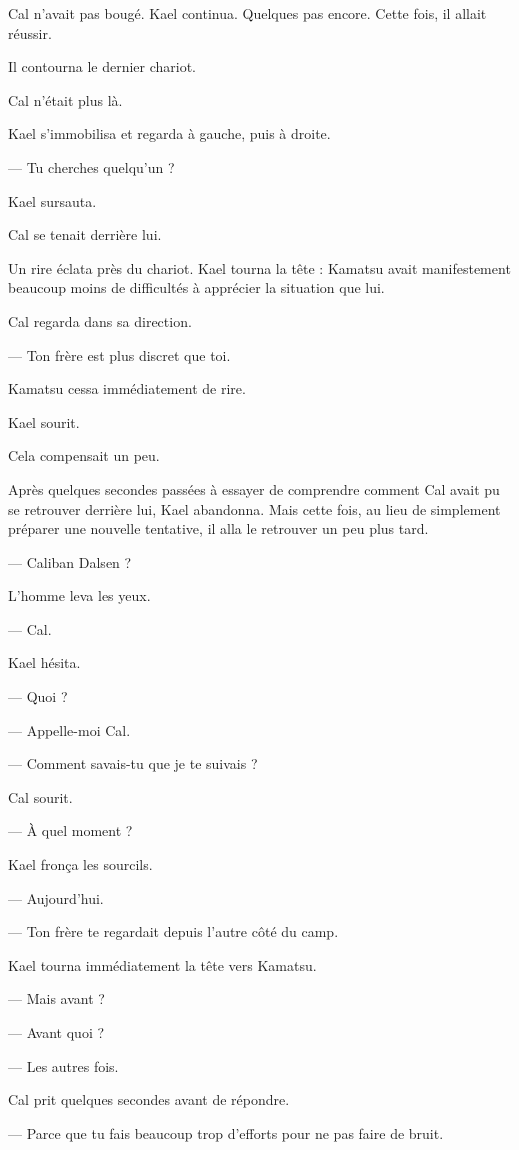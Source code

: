 Cal n'avait pas bougé. Kael continua. Quelques pas encore. Cette fois, il allait réussir.

Il contourna le dernier chariot.

Cal n'était plus là.

Kael s'immobilisa et regarda à gauche, puis à droite.

— Tu cherches quelqu'un ?

Kael sursauta.

Cal se tenait derrière lui.

Un rire éclata près du chariot. Kael tourna la tête : Kamatsu avait
manifestement beaucoup moins de difficultés à apprécier la situation que lui.

Cal regarda dans sa direction.

— Ton frère est plus discret que toi.

Kamatsu cessa immédiatement de rire.

Kael sourit.

Cela compensait un peu.

\scenebreak

Après quelques secondes passées à essayer de comprendre comment Cal avait pu se
retrouver derrière lui, Kael abandonna. Mais cette fois, au lieu de simplement
préparer une nouvelle tentative, il alla le retrouver un peu plus tard.

— Caliban Dalsen ?

L'homme leva les yeux.

— Cal.

Kael hésita.

— Quoi ?

— Appelle-moi Cal.

— Comment savais-tu que je te suivais ?

Cal sourit.

— À quel moment ?

Kael fronça les sourcils.

— Aujourd'hui.

— Ton frère te regardait depuis l'autre côté du camp.

Kael tourna immédiatement la tête vers Kamatsu.

— Mais avant ?

— Avant quoi ?

— Les autres fois.

Cal prit quelques secondes avant de répondre.

— Parce que tu fais beaucoup trop d'efforts pour ne pas faire de bruit.

